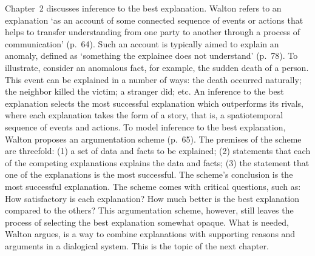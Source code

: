 \documentclass[12pt]{article}
\begin{document}
Chapter~2 discusses inference to the best explanation. Walton refers to an explanation 
`as an account of some connected sequence of events or actions that helps to transfer understanding 
from one party to another through a process of communication' (p.\ 64). 
Such an account is typically aimed to explain an anomaly, defined as 
`something the explainee does not understand' %
(p.\ 78). 
To illustrate, consider an
anomalous fact, for example, the sudden death of a person. This event can be explained in a number of ways: 
the death occurred naturally; 
the neighbor killed the victim; a stranger did; etc. An inference to the best explanation selects the
most successful explanation which outperforms its rivals, where each explanation takes
the form of a story, that is, a spatiotemporal sequence of events and actions.
To model inference to the best explanation, Walton proposes 
an argumentation scheme (p.\ 65). The premises of the scheme are threefold: (1) 
a set of data and facts to be explained; (2) statements that each of the competing explanations explains 
the data and facts; (3) the statement that one of the explanations is the most successful. 
The scheme's conclusion is the most successful explanation. The scheme comes with critical questions, such as: 
How satisfactory is each explanation? How much better is the best explanation compared to the others? 
This %
argumentation scheme, however, still leaves the process of selecting the best explanation somewhat opaque. 
What is needed, Walton argues, is a way to combine explanations with supporting 
reasons and arguments in a dialogical system. This
is the topic of the next chapter.
\end{document}
